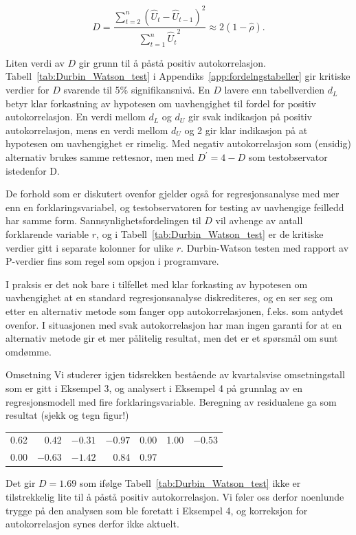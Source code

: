 \[ D=\frac{\sum_{t=2}^n {({\hat{U}}_t-{\hat{U}}_{t-1})}^2} 
          {\sum_{t=1}^n {{\hat{U}}_t}^2}  \approx 2(1-\hat{\rho}) . \]

\noindent Liten verdi av $D$ gir grunn til å påstå positiv
autokorrelasjon.
Tabell~\ref{tab:Durbin_Watson_test} i Appendiks~\ref{app:fordelngstabeller} gir kritiske verdier for $D$ svarende til 5\% signifikansnivå.
En $D$ lavere enn tabellverdien $d_L$ betyr klar forkastning av hypotesen om
uavhengighet til fordel for positiv autokorrelasjon.
En verdi mellom $d_L$ og $d_U$ gir svak indikasjon på positiv 
autokorrelasjon, mens en verdi mellom $d_U$ og 2 gir klar indikasjon på at
hypotesen om uavhengighet er rimelig. Med negativ auto\-korrelasjon som (ensidig)
alternativ brukes samme rettesnor, men med $D^{'}=4-D$ som testobservator
istedenfor D.


De forhold som er diskutert ovenfor gjelder også for regresjons\-ana\-lyse
med mer enn en forklaringsvariabel, og testobservatoren for testing av
uavhengige feilledd har samme form. Sannsynlighetsfordelingen til $D$ vil
avhenge av antall forklarende variable $r$, og i Tabell~\ref{tab:Durbin_Watson_test} er 
de kritiske verdier gitt i separate kolonner for ulike $r$.
Durbin-Watson testen med rapport av P-verdier fins som regel som opsjon i 
programvare.
 

I praksis er det nok bare i tilfellet med klar forkasting av hypotesen om
uavhengighet at en standard regresjonsanalyse diskrediteres, og en ser seg om
etter en alternativ metode som fanger opp autokorrelasjonen, f.eks.
som antydet ovenfor. I situasjonen med svak autokorrelasjon har man ingen
garanti for at en alternativ metode gir et mer pålitelig resultat, men det
er et spørsmål om sunt omdømme. \\

\begin{eksempel}{Omsetning}
Vi studerer igjen tidsrekken bestående av kvartalsvise omsetningstall
som er gitt i Eksempel 3, og analysert i Eksempel 4 på grunnlag av en
regre\-sjons\-modell med fire forklaringsvariable.  Beregning av residualene
ga som resultat (sjekk og tegn figur!) 
\begin{center}
\begin{tabular}{rrrrrrr}
     0.62  &  0.42  &  $-0.31$  &  $-0.97$  &  0.00  &  1.00  &  $-0.53$ \\
     0.00  & $-0.63$  &  $-1.42$  &   0.84  &  0.97  &        &
\end{tabular}
\end{center}
Det gir $D = 1.69$ som ifølge Tabell~\ref{tab:Durbin_Watson_test} ikke er tilstrekkelig lite til
å påstå positiv autokorrelasjon.  Vi føler oss derfor 
noenlunde trygge på den analysen som ble foretatt i Eksempel 4, og 
korreksjon for autokorrelasjon synes derfor ikke aktuelt.
\end{eksempel}

